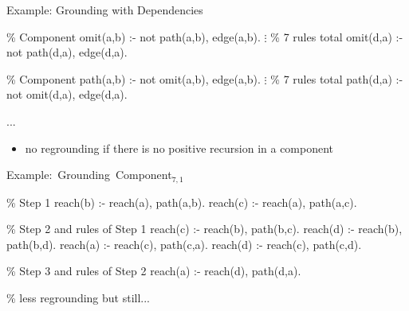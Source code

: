 \begin{frame}[fragile]{Example: Grounding with Dependencies}
\begin{SemiVerbatim}{.9}
{\color{comment}\% Component}
omit(a,b) :- not path(a,b), \alert{edge(a,b)}.
          \(\vdots\) {\color{comment}\% 7 rules total}
omit(d,a) :- not path(d,a), \alert{edge(d,a)}.

{\color{comment}\% Component}
path(a,b) :- not omit(a,b), \alert{edge(a,b)}.
          \(\vdots\) {\color{comment}\% 7 rules total}
path(d,a) :- not omit(d,a), \alert{edge(d,a)}.

...
\end{SemiVerbatim}
\vspace{-.8cm}
\begin{itemize}
  \item no regrounding if there is no positive recursion in a component
\end{itemize}
\end{frame}

\begin{frame}[fragile]{\mbox{Example: Grounding Component\(_{7,1}\)}}
\begin{SemiVerbatim}{.9}
{\color{comment}\% Step 1}
reach(b) :- \alert{reach(a)}, \alert{path(a,b)}.
reach(c) :- \alert{reach(a)}, \alert{path(a,c)}.

{\color{comment}\% Step 2 \alert{and} rules of Step 1}
reach(c) :- \alert{reach(b)}, path(b,c).
reach(d) :- \alert{reach(b)}, path(b,d).
reach(a) :- \alert{reach(c)}, path(c,a).
reach(d) :- \alert{reach(c)}, path(c,d).

{\color{comment}\% Step 3 \alert{and} rules of Step 2}
reach(a) :- \alert{reach(d)}, path(d,a).

{\color{comment}\% less regrounding but still...}
\end{SemiVerbatim}
\end{frame}


